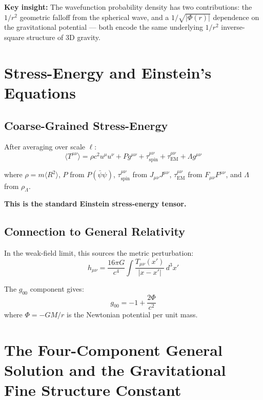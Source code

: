 \documentclass[11pt,a4paper]{article}
\theoremstyle{definition}
\theoremstyle{remark}
\begin{document}
	\textbf{Key insight:} The wavefunction probability density has two contributions: the $1/r^2$ geometric falloff from the spherical wave, and a $1/\sqrt{|\Phi(r)|}$ dependence on the gravitational potential --- both encode the same underlying $1/r^2$ inverse-square structure of 3D gravity.
	
	\section{Stress-Energy and Einstein's Equations}
	
	\subsection{Coarse-Grained Stress-Energy}
	
	After averaging over scale $\ell$:
	\begin{equation}
		\langle T^{\mu\nu}\rangle = \rho c^2 u^\mu u^\nu + Pg^{\mu\nu} + \tau^{\mu\nu}_{\mathrm{spin}} + \tau^{\mu\nu}_{\mathrm{EM}} + \Lambda g^{\mu\nu}
		\label{eq:T_fluid}
	\end{equation}
	
	where $\rho=m\langle R^2\rangle$, $P$ from $P(\bar{\psi}\psi)$, $\tau^{\mu\nu}_{\mathrm{spin}}$ from $J_{\mu\nu}J^{\mu\nu}$, $\tau^{\mu\nu}_{\mathrm{EM}}$ from $F_{\mu\nu}F^{\mu\nu}$, and $\Lambda$ from $\rho_\Lambda$.
	
	\textbf{This is the standard Einstein stress-energy tensor.}
	
	\subsection{Connection to General Relativity}
	
	In the weak-field limit, this sources the metric perturbation:
	\begin{equation}
		h_{\mu\nu} = \frac{16\pi G}{c^4}\int\frac{T_{\mu\nu}(x')}{|x-x'|}\,d^3x'
	\end{equation}
	
	The $g_{00}$ component gives:
	\begin{equation}
		g_{00} = -1 + \frac{2\Phi}{c^2}
	\end{equation}
	where $\Phi=-GM/r$ is the Newtonian potential per unit mass.
	
	\section{The Four-Component General Solution and the Gravitational Fine Structure Constant}
	\label{sec:four_component}
	
\end{document}
